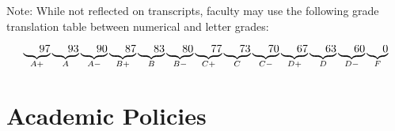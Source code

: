 Note:  While not reflected on transcripts, faculty may use the following grade translation table between numerical and letter grades:


	$$\underbrace{ \hspace{5mm} 97}_{A+}
  \underbrace{\hspace{5mm} 93}_{A}
  \underbrace{\hspace{5mm} 90}_{A-}
  \underbrace{\hspace{5mm} 87}_{B+}
  \underbrace{\hspace{5mm} 83}_{B}
  \underbrace{\hspace{5mm} 80}_{B-}
  \underbrace{\hspace{5mm} 77}_{C+}
  \underbrace{\hspace{5mm} 73}_{C}
  \underbrace{\hspace{5mm} 70}_{C-}
  \underbrace{\hspace{5mm} 67}_{D+}
  \underbrace{\hspace{5mm} 63}_{D}
  \underbrace{\hspace{5mm} 60}_{D-}
  \underbrace{\hspace{5mm} 0}_{F}$$
  
  



\section{Academic Policies}

